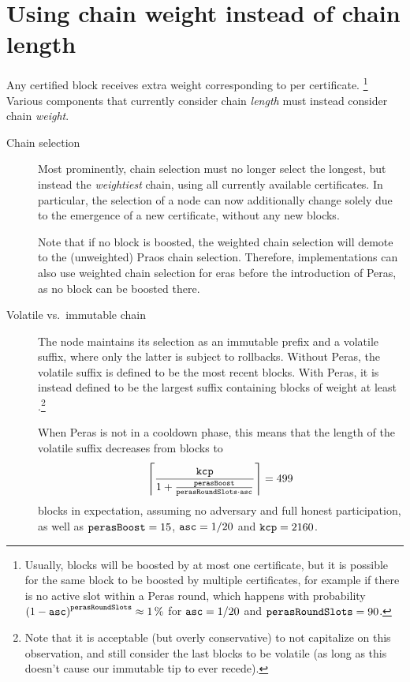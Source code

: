 \section{Using chain weight instead of chain length}\label{sec:weight not length}

Any certified block receives extra weight corresponding to \perasBoost{} per certificate.%
\footnote{Usually, blocks will be boosted by at most one certificate, but it is possible for the same block to be boosted by multiple certificates, for example if there is no active slot within a Peras round, which happens with probability ${(1-\mathtt{asc})}^{\mathtt{perasRoundSlots}} \approx \qty{1}{\percent}$ for $\mathtt{asc}=1/20$ and $\mathtt{perasRoundSlots}=90$.}
Various components that currently consider chain \emph{length} must instead consider chain \emph{weight}.

\begin{description}
\item[Chain selection]
  Most prominently, chain selection must no longer select the longest, but instead the \emph{weightiest} chain, using all currently available certificates.
  In particular, the selection of a node can now additionally change solely due to the emergence of a new certificate, without any new blocks.

  Note that if no block is boosted, the weighted chain selection will demote to the (unweighted) Praos chain selection.
  Therefore, implementations can also use weighted chain selection for eras before the introduction of Peras, as no block can be boosted there.
\item[Volatile vs.\ immutable chain]
  The node maintains its selection as an immutable prefix and a volatile suffix, where only the latter is subject to rollbacks.
  Without Peras, the volatile suffix is defined to be the \kcp{} most recent blocks.
  With Peras, it is instead defined to be the largest suffix containing blocks of weight at least \kcp{}.\footnote{
    Note that it is acceptable (but overly conservative) to not capitalize on this observation, and still consider the last \kcp{} blocks to be volatile (as long as this doesn't cause our immutable tip to ever recede).}

  When Peras is not in a cooldown phase, this means that the length of the volatile suffix decreases from \kcp{} blocks to
  \[ \left\lceil \frac{\mathtt{kcp} }{1 + \frac{\mathtt{perasBoost}}{\mathtt{perasRoundSlots} \cdot \mathtt{asc}}} \right\rceil = 499 \]
  blocks in expectation, assuming no adversary and full honest participation, as well as $\mathtt{perasBoost} = 15$, $\mathtt{asc} = 1/20$ and $\mathtt{kcp} = 2160$.


\end{description}
